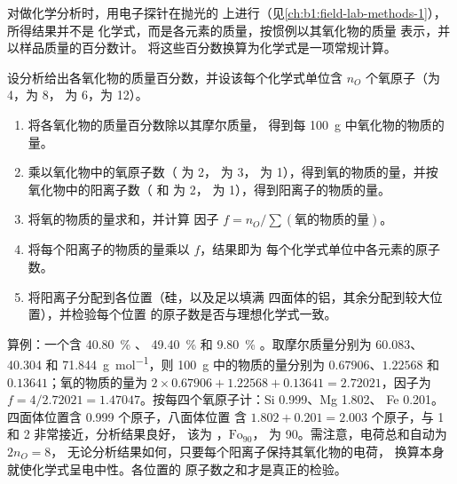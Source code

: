对做化学分析时，用电子探针在抛光的
上进行（见\cref{ch:b1:field-lab-methods-1}），所得结果并不是
化学式，而是各元素的质量，按惯例以其氧化物的质量
表示，并以样品质量的百分数计。
将这些百分数换算为化学式是一项常规计算。

\begin{method}[在固定氧原子数下重算分析结果]\label{met:b1:rock-forming-minerals:recalculation}
设分析给出各氧化物的质量百分数，并设该每个化学式单位含
$n_O$ 个氧原子（为 4，为 8，
为 6，为 12）。
\begin{enumerate}
  \item 将各氧化物的质量百分数除以其摩尔质量，
        得到每 \qty{100}{g} 中氧化物的物质的量。
  \item 乘以氧化物中的氧原子数（ 为 2， 为 3，
         为 1），得到氧的物质的量，并按
        氧化物中的阳离子数（ 和  为 2， 为
        1），得到阳离子的物质的量。
  \item 将氧的物质的量求和，并计算
        因子 $f = n_O / \sum(\text{氧的物质的量})$。
  \item 将每个阳离子的物质的量乘以 $f$，结果即为
        每个化学式单位中各元素的原子数。
  \item 将阳离子分配到各位置（硅，以及足以填满
        四面体的铝，其余分配到较大位置），并检验每个位置
        的原子数是否与理想化学式一致。
\end{enumerate}
\end{method}

算例：一个含 \qty{40.80}{\percent} 、
\qty{49.40}{\percent}  和 \qty{9.80}{\percent} 。取摩尔质量分别为
\num{60.083}、\num{40.304} 和 \qty{71.844}{g.mol^{-1}}，则
\qty{100}{g} 中的物质的量分别为 $0.67906$、$1.22568$ 和 $0.13641$；氧的物质的量为
$2\times0.67906 + 1.22568 + 0.13641 = 2.72021$，因子为
$f = 4/2.72021 = 1.47047$。按每四个氧原子计：Si \num{0.999}、Mg \num{1.802}、
Fe \num{0.201}。四面体位置含 \num{0.999} 个原子，八面体位置
含 $1.802 + 0.201 = 2.003$ 个原子，与 1 和 2 非常接近，分析结果良好，
该为 ，$\text{Fo}_{90}$，
为 90。需注意，电荷总和自动为 $2n_O = 8$，
无论分析结果如何，只要每个阳离子保持其氧化物的电荷，
换算本身就使化学式呈电中性。各位置的
原子数之和才是真正的检验。

